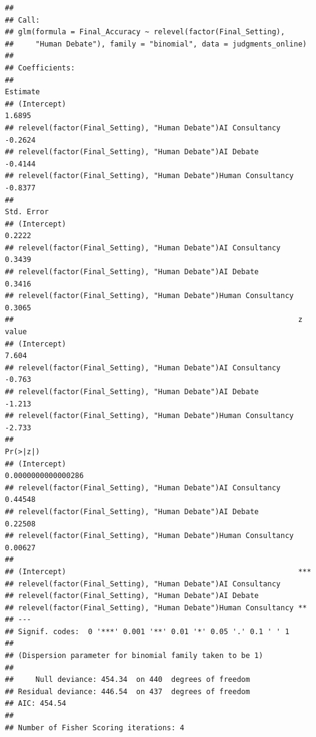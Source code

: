 \documentclass[
]{article}
\newenvironment{Shaded}{\begin{snugshade}}{\end{snugshade}}
\newcommand{\FloatTok}[1]{\textcolor[rgb]{0.00,0.00,0.81}{#1}}
\newcommand{\FunctionTok}[1]{\textcolor[rgb]{0.13,0.29,0.53}{\textbf{#1}}}
\newcommand{\NormalTok}[1]{#1}
\newcommand{\SpecialCharTok}[1]{\textcolor[rgb]{0.81,0.36,0.00}{\textbf{#1}}}
\begin{document}
\begin{verbatim}
## 
## Call:
## glm(formula = Final_Accuracy ~ relevel(factor(Final_Setting), 
##     "Human Debate"), family = "binomial", data = judgments_online)
## 
## Coefficients:
##                                                                 Estimate
## (Intercept)                                                       1.6895
## relevel(factor(Final_Setting), "Human Debate")AI Consultancy     -0.2624
## relevel(factor(Final_Setting), "Human Debate")AI Debate          -0.4144
## relevel(factor(Final_Setting), "Human Debate")Human Consultancy  -0.8377
##                                                                 Std. Error
## (Intercept)                                                         0.2222
## relevel(factor(Final_Setting), "Human Debate")AI Consultancy        0.3439
## relevel(factor(Final_Setting), "Human Debate")AI Debate             0.3416
## relevel(factor(Final_Setting), "Human Debate")Human Consultancy     0.3065
##                                                                 z value
## (Intercept)                                                       7.604
## relevel(factor(Final_Setting), "Human Debate")AI Consultancy     -0.763
## relevel(factor(Final_Setting), "Human Debate")AI Debate          -1.213
## relevel(factor(Final_Setting), "Human Debate")Human Consultancy  -2.733
##                                                                           Pr(>|z|)
## (Intercept)                                                     0.0000000000000286
## relevel(factor(Final_Setting), "Human Debate")AI Consultancy               0.44548
## relevel(factor(Final_Setting), "Human Debate")AI Debate                    0.22508
## relevel(factor(Final_Setting), "Human Debate")Human Consultancy            0.00627
##                                                                    
## (Intercept)                                                     ***
## relevel(factor(Final_Setting), "Human Debate")AI Consultancy       
## relevel(factor(Final_Setting), "Human Debate")AI Debate            
## relevel(factor(Final_Setting), "Human Debate")Human Consultancy ** 
## ---
## Signif. codes:  0 '***' 0.001 '**' 0.01 '*' 0.05 '.' 0.1 ' ' 1
## 
## (Dispersion parameter for binomial family taken to be 1)
## 
##     Null deviance: 454.34  on 440  degrees of freedom
## Residual deviance: 446.54  on 437  degrees of freedom
## AIC: 454.54
## 
## Number of Fisher Scoring iterations: 4
\end{verbatim}

\begin{Shaded}
\end{Shaded}
\end{document}
